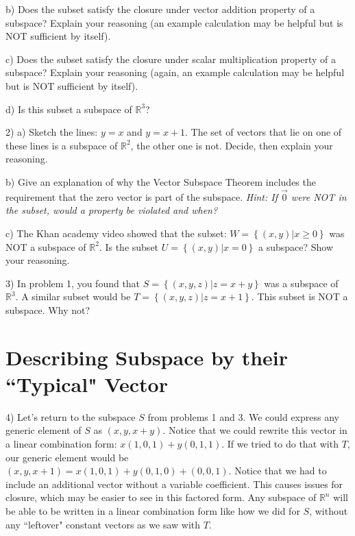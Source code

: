 \documentclass{article}
\begin{document}
\begin{flushleft}
\vspace{1in}

b) Does the subset satisfy the closure under vector addition property of a subspace?  Explain your reasoning (an example calculation may be helpful but is NOT sufficient by itself).

\vspace{3in}

c) Does the subset satisfy the closure under scalar multiplication property of a subspace? Explain your reasoning (again, an example calculation may be helpful but is NOT sufficient by itself).

\vspace{3in}

d) Is this subset a subspace of $\mathbb{R}^3$?

\pagebreak

2) a) Sketch the lines: $y=x$ and $ y=x+1$.  The set of vectors that lie on one of these lines is a subspace of $\mathbb{R}^2$, the other one is not. Decide, then explain your reasoning.

\vspace{2.5in}

b) Give an explanation of why the Vector Subspace Theorem includes the requirement that the zero vector is part of the subspace. \textit{Hint: If $\vec{0}$ were NOT in the subset, would a property be violated and when?}

\vspace{1in}

c) The Khan academy video showed that the subset: $W=\left\{ (x,y)|x\geq 0 \right\}$ was NOT a subspace of $\mathbb{R}^2$.  Is the subset $U=\left\{ (x,y)|x=0 \right\}$ a subspace? Show your reasoning.

\vspace{1.5in}

3) In problem 1, you found that $S=\left\{ (x,y,z)| z = x + y \right\}$ was a subspace of $\mathbb{R}^3$.  A similar subset would be $T=\left\{ (x,y,z)| z = x + 1 \right\}$.  This subset is NOT a subspace.  Why not?

\pagebreak

\section*{Describing Subspace by their ``Typical" Vector}

4) Let's return to the subspace $S$ from problems 1 and 3.  We could express any generic element of $S$ as $(x,y,x+y)$.  Notice that we could rewrite this vector in a linear combination form:  $x(1,0,1) + y(0,1,1)$.  If we tried to do that with $T$, our generic element would be $(x,y,x+1) = x(1,0,1) + y(0,1,0) + (0,0,1)$.  Notice that we had to include an additional vector without a variable coefficient.  This causes issues for closure, which may be easier to see in this factored form.  Any subspace of $\mathbb{R}^n$ will be able to be written in a linear combination form like how we did for $S$, without any ``leftover" constant vectors as we saw with $T$.


\end{flushleft}
\end{document}

